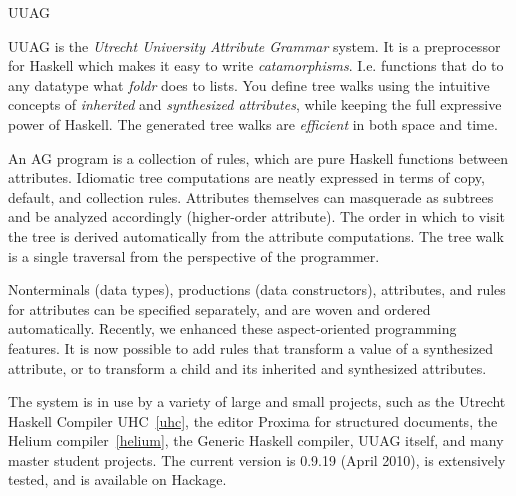 \begin{hcarentry}[updated]{UUAG}
\label{uuag}
\makeheader

UUAG is the \emph{Utrecht University Attribute Grammar} system. It is a preprocessor for Haskell which makes it easy to write \emph{catamorphisms}. I.e. functions that do to any datatype what \emph{foldr} does to lists. You define tree walks using the intuitive concepts of \emph{inherited} and \emph{synthesized attributes}, while keeping the full expressive power of Haskell. The generated tree walks are \emph{efficient} in both space and time.

An AG program is a collection of rules, which are pure Haskell functions between attributes.
Idiomatic tree computations are neatly expressed in terms of copy, default, and collection rules. Attributes themselves can masquerade as subtrees and be analyzed accordingly (higher-order attribute). The order in which to visit the tree is derived automatically from the attribute computations. The tree walk is a single traversal from the perspective of the programmer.

Nonterminals (data types), productions (data constructors), attributes, and rules for attributes can be specified separately, and are woven and ordered automatically. Recently, we enhanced these aspect-oriented programming features. It is now possible to add rules that transform a value of a synthesized attribute, or to transform a child and its inherited and synthesized attributes.

The system is in use by a variety of large and small projects, such as the Utrecht Haskell Compiler UHC~\cref{uhc}, the editor Proxima for structured documents, the Helium compiler~\cref{helium}, the Generic Haskell compiler, UUAG itself, and many master student projects. The current version is 0.9.19 (April 2010), is extensively tested, and is available on Hackage.


\end{hcarentry}
